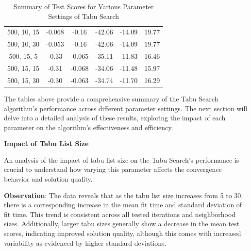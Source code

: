 \documentclass{article}
\begin{document}
\begin{table}[H]
{\begin{tabular}{|c|c|c|c|c|c|}
                500, 10, 15                & -0.068                     & -0.16                      & -42.06                     & -14.09                   & 19.77                   \\
                500, 10, 30                & -0.053                     & -0.16                      & -42.06                     & -14.09                   & 19.77                   \\
                500, 15, 5                 & -0.33                      & -0.065                     & -35.11                     & -11.83                   & 16.46                   \\
                500, 15, 15                & -0.31                      & -0.068                     & -34.06                     & -11.48                   & 15.97                   \\
                500, 15, 30                & -0.30                      & -0.063                     & -34.74                     & -11.70                   & 16.29                   \\
                \hline
            \end{tabular}
        }
        \caption{Summary of Test Scores for Various Parameter Settings of Tabu Search}
        \label{tab:ts_summary_test_scores}
    \end{table}

    The tables above provide a comprehensive summary of the Tabu Search algorithm's performance across different parameter settings. The next section will delve into a detailed analysis of these results, exploring the impact of each parameter on the algorithm's effectiveness and efficiency.

    \textbf{Impact of Tabu List Size}

    An analysis of the impact of tabu list size on the Tabu Search's performance is crucial to understand how varying this parameter affects the convergence behavior and solution quality.

    \textbf{Observation}: The data reveals that as the tabu list size increases from 5 to 30, there is a corresponding increase in the mean fit time and standard deviation of fit time. This trend is consistent across all tested iterations and neighborhood sizes. Additionally, larger tabu sizes generally show a decrease in the mean test scores, indicating improved solution quality, although this comes with increased variability as evidenced by higher standard deviations.
\end{document}
